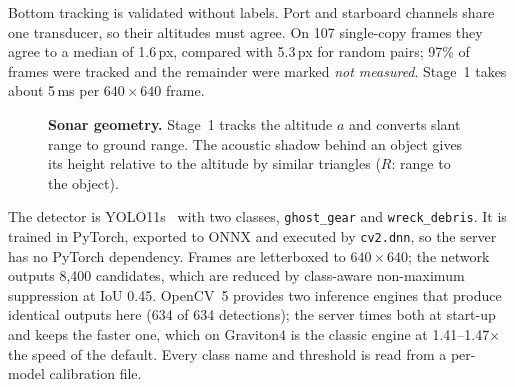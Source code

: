 \documentclass[10pt,twocolumn,letterpaper]{article}
\makeatletter
\renewcommand\subsection{\@startsection{subsection}{2}{\z@}{-1.6ex plus -0.5ex minus -.2ex}{0.6ex plus .2ex}{\normalsize\bfseries}}
\makeatother
\begin{document}
Bottom tracking is validated without labels. Port and starboard channels share
one transducer, so their altitudes must agree. On 107 single-copy frames they
agree to a median of 1.6\,px, compared with 5.3\,px for random pairs; 97\% of
frames were tracked and the remainder were marked \emph{not measured}. Stage~1
takes about 5\,ms per $640\times640$ frame.

\begin{figure}[t]
\centering
{}
\caption{\textbf{Sonar geometry.} Stage~1 tracks the altitude $a$ and converts
slant range to ground range. The acoustic shadow behind an object gives its
height relative to the altitude by similar triangles ($R$: range to the object).}
\label{fig:geom}
\end{figure}

\subsection{Detection}
The detector is YOLO11s~\cite{yolo11} with two classes, \texttt{ghost\_gear} and
\texttt{wreck\_debris}. It is trained in PyTorch, exported to ONNX and executed
by \texttt{cv2.dnn}, so the server has no PyTorch dependency. Frames are
letterboxed to $640\times640$; the network outputs 8{,}400 candidates, which are
reduced by class-aware non-maximum suppression at IoU 0.45. OpenCV~5 provides two
inference engines that produce identical outputs here (634 of 634 detections);
the server times both at start-up and keeps the faster one, which on Graviton4 is
the classic engine at 1.41--1.47$\times$ the speed of the default. Every class
name and threshold is read from a per-model calibration file.
\end{document}

